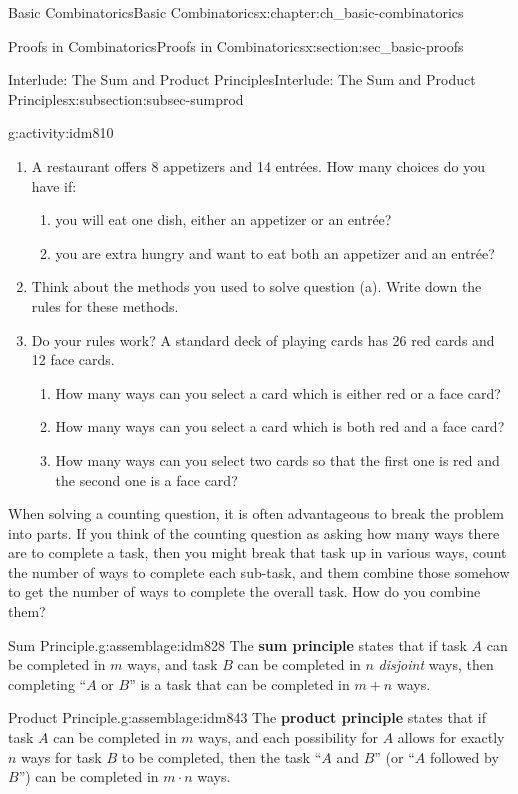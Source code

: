 \documentclass[oneside,10pt,]{book}
\newcommand{\terminology}[1]{\textbf{#1}}
\numberwithin{equation}{chapter}
\begin{document}
\begin{chapterptx}{Basic Combinatorics}{}{Basic Combinatorics}{}{}{x:chapter:ch_basic-combinatorics}
\begin{sectionptx}{Proofs in Combinatorics}{}{Proofs in Combinatorics}{}{}{x:section:sec_basic-proofs}
\begin{subsectionptx}{Interlude: The Sum and Product Principles}{}{Interlude: The Sum and Product Principles}{}{}{x:subsection:subsec-sumprod}
\begin{activity}{}{g:activity:idm810}%
\begin{enumerate}[font=\bfseries,label=(\alph*),ref=\alph*]
\item{}A restaurant offers 8 appetizers and 14 entrées. How many choices do you have if:%
\begin{enumerate}
\item{}you will eat one dish, either an appetizer or an entrée?%
\item{}you are extra hungry and want to eat both an appetizer and an entrée?%
\end{enumerate}
%
\item{}Think about the methods you used to solve question (a). Write down the rules for these methods.%
\item{}Do your rules work? A standard deck of playing cards has 26 red cards and 12 face cards.%
\begin{enumerate}
\item{}How many ways can you select a card which is either red or a face card?%
\item{}How many ways can you select a card which is both red and a face card?%
\item{}How many ways can you select two cards so that the first one is red and the second one is a face card?%
\end{enumerate}
%
\end{enumerate}
\end{activity}
When solving a counting question, it is often advantageous to break the problem into parts.  If you think of the counting question as asking how many ways there are to complete a task, then you might break that task up in various ways, count the number of ways to complete each sub-task, and them combine those somehow to get the number of ways to complete the overall task.  How do you combine them?%
\begin{assemblage}{Sum Principle.}{g:assemblage:idm828}%
The \terminology{sum principle} states that if task \(A\) can be completed in \(m\) ways, and task \(B\) can be completed in \(n\) \emph{disjoint} ways, then completing ``\(A\) or \(B\)'' is a task that can be completed in \(m + n\) ways.%
\end{assemblage}
\begin{assemblage}{Product Principle.}{g:assemblage:idm843}%
The \terminology{product principle} states that if task \(A\) can be completed in \(m\) ways, and each possibility for \(A\) allows for exactly \(n\) ways for task \(B\) to be completed, then the task ``\(A\) and \(B\)'' (or ``\(A\) followed by \(B\)'') can be completed in \(m \cdot n\) ways.%

\end{assemblage}
\end{subsectionptx}
\end{sectionptx}
\end{chapterptx}
\end{document}
